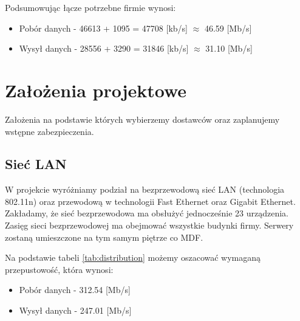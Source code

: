 \documentclass[a4paper,12pt]{extarticle}  %
\begin{document}
\begin{table}[H]
	\centering
	\caption{Szacowane łącze internetowe serwerów}
	\label{tab:usage_server}%
\end{table}%

Podsumowując łącze potrzebne firmie wynosi:
\begin{itemize}
	\item Pobór danych - 46613 + 1095 = 47708 [kb/s] $\approx$ 46.59 [Mb/s]
	\item Wysył danych - 28556 + 3290 = 31846 [kb/s] $\approx$ 31.10 [Mb/s]
\end{itemize}

\section{Założenia projektowe}
Założenia na podstawie których wybierzemy dostawców oraz zaplanujemy wstępne zabezpieczenia.
\subsection{Sieć LAN}
W projekcie wyróżniamy podział na bezprzewodową sieć LAN
(technologia 802.11n) oraz przewodową w technologii
Fast Ethernet oraz Gigabit Ethernet.
Zakładamy, że sieć bezprzewodowa ma obsłużyć jednocześnie
23 urządzenia. Zasięg sieci bezprzewodowej ma obejmować
wszystkie budynki firmy.
Serwery zostaną umieszczone na tym samym piętrze co MDF.

Na podstawie tabeli \ref{tab:distribution} możemy oszacować wymaganą przepustowość, która wynosi:
\begin{itemize}
	\item Pobór danych - 312.54 [Mb/s]
	\item Wysył danych - 247.01 [Mb/s]
\end{itemize}
\end{document}
